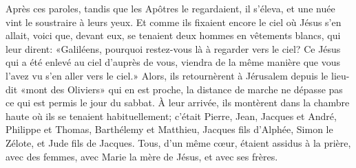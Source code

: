 Après ces paroles, tandis que les Apôtres le regardaient,
	il s’éleva, et une nuée vint le soustraire à leurs yeux.
Et comme ils fixaient encore le ciel où Jésus s’en allait,
	voici que, devant eux, se tenaient deux hommes en vêtements blancs,
	qui leur dirent: «Galiléens, pourquoi restez-vous là à regarder vers le ciel?
	Ce Jésus qui a été enlevé au ciel d’auprès de vous,
	viendra de la même manière que vous l’avez vu s’en aller vers le ciel.»
Alors, ils retournèrent à Jérusalem
		depuis le lieu-dit «mont des Oliviers» qui en est proche,
	la distance de marche ne dépasse pas ce qui est permis le jour du sabbat.
À leur arrivée, ils montèrent dans la chambre haute où ils se tenaient habituellement;
	c’était Pierre, Jean, Jacques et André, Philippe et Thomas, Barthélemy et Matthieu,
	Jacques fils d’Alphée, Simon le Zélote, et Jude fils de Jacques.
Tous, d’un même cœur, étaient assidus à la prière,
	avec des femmes, avec Marie la mère de Jésus, et avec ses frères.
